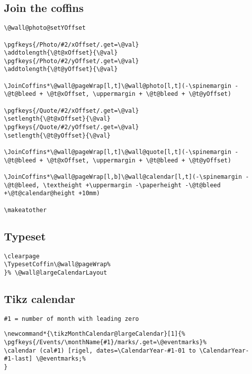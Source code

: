 \documentclass[11pt,oneside]{memoir-article}
\begin{document}
\subsection{Join the coffins}
\label{sec:org73aec18}

\begin{verbatim}
\@wall@photo@setYOffset

\pgfkeys{/Photo/#2/xOffset/.get=\@val}
\addtolength{\@t@xOffset}{\@val}
\pgfkeys{/Photo/#2/yOffset/.get=\@val}
\addtolength{\@t@yOffset}{\@val}

\JoinCoffins*\@wall@pageWrap[l,t]\@wall@photo[l,t](-\spinemargin -\@t@bleed + \@t@xOffset, \uppermargin + \@t@bleed + \@t@yOffset)

\pgfkeys{/Quote/#2/xOffset/.get=\@val}
\setlength{\@t@xOffset}{\@val}
\pgfkeys{/Quote/#2/yOffset/.get=\@val}
\setlength{\@t@yOffset}{\@val}

\JoinCoffins*\@wall@pageWrap[l,t]\@wall@quote[l,t](-\spinemargin -\@t@bleed + \@t@xOffset, \uppermargin + \@t@bleed + \@t@yOffset)

\JoinCoffins*\@wall@pageWrap[l,b]\@wall@calendar[l,t](-\spinemargin -\@t@bleed, \textheight +\uppermargin -\paperheight -\@t@bleed +\@t@calendar@height +10mm)

\makeatother
\end{verbatim}

\subsection{Typeset}
\label{sec:org6f1832b}

\begin{verbatim}
\clearpage
\TypesetCoffin\@wall@pageWrap%
}% \@wall@largeCalendarLayout
\end{verbatim}

\subsection{Tikz calendar}
\label{sec:org117e2d0}

\begin{verbatim}
#1 = number of month with leading zero
\end{verbatim}


\begin{verbatim}
\newcommand*{\tikzMonthCalendar@largeCalendar}[1]{%
\pgfkeys{/Events/\monthName{#1}/marks/.get=\@eventmarks}%
\calendar (cal#1) [rigel, dates=\CalendarYear-#1-01 to \CalendarYear-#1-last] \@eventmarks;%
}
\end{verbatim}
\end{document}
